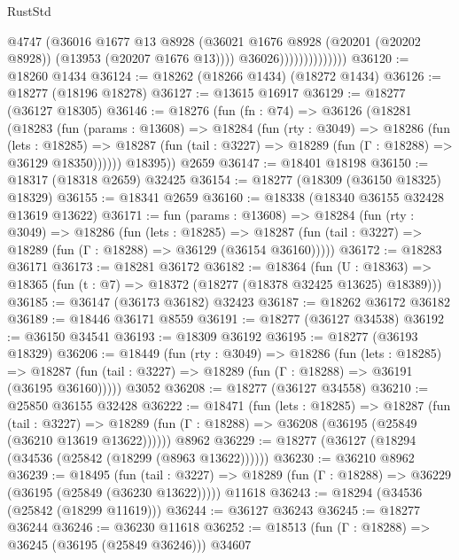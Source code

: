 \begin{lexlean}{RustStd}
\begin{coremodule}
                                @4747
                                (@36016
                                  @1677
                                  @13
                                  @8928
                                  (@36021
                                    @1676
                                    @8928
                                    (@20201 (@20202 @8928))
                                    (@13953 (@20207 @1676 @13))))
                                @36026))))))))))))))
@36120 := @18260 @1434
@36124 := @18262 (@18266 @1434) (@18272 @1434)
@36126 := @18277 (@18196 @18278)
@36127 := @13615 @16917
@36129 := @18277 (@36127 @18305)
@36146 := @18276
    (fun (fn : @74) =>
    @36126
      (@18281
        (@18283
          (fun (params : @13608) =>
          @18284
            (fun (rty : @3049) =>
            @18286
              (fun (lets : @18285) =>
              @18287 (fun (tail : @3227) => @18289 (fun (Γ : @18288) => @36129 @18350))))))
        @18395))
    @2659
@36147 := @18401 @18198
@36150 := @18317 (@18318 @2659) @32425
@36154 := @18277 (@18309 (@36150 @18325) @18329)
@36155 := @18341 @2659
@36160 := @18338 (@18340 @36155 @32428 @13619 @13622)
@36171 := fun (params : @13608) =>
  @18284
    (fun (rty : @3049) =>
    @18286
      (fun (lets : @18285) =>
      @18287 (fun (tail : @3227) => @18289 (fun (Γ : @18288) => @36129 (@36154 @36160)))))
@36172 := @18283 @36171
@36173 := @18281 @36172
@36182 := @18364
    (fun (U : @18363) => @18365 (fun (t : @7) => @18372 (@18277 (@18378 @32425 @13625) @18389)))
@36185 := @36147 (@36173 @36182) @32423
@36187 := @18262 @36172 @36182
@36189 := @18446 @36171 @8559
@36191 := @18277 (@36127 @34538)
@36192 := @36150 @34541
@36193 := @18309 @36192
@36195 := @18277 (@36193 @18329)
@36206 := @18449
    (fun (rty : @3049) =>
    @18286
      (fun (lets : @18285) =>
      @18287 (fun (tail : @3227) => @18289 (fun (Γ : @18288) => @36191 (@36195 @36160)))))
    @3052
@36208 := @18277 (@36127 @34558)
@36210 := @25850 @36155 @32428
@36222 := @18471
    (fun (lets : @18285) =>
    @18287
      (fun (tail : @3227) =>
      @18289 (fun (Γ : @18288) => @36208 (@36195 (@25849 (@36210 @13619 @13622))))))
    @8962
@36229 := @18277 (@36127 (@18294 (@34536 (@25842 (@18299 (@8963 @13622))))))
@36230 := @36210 @8962
@36239 := @18495
    (fun (tail : @3227) => @18289 (fun (Γ : @18288) => @36229 (@36195 (@25849 (@36230 @13622)))))
    @11618
@36243 := @18294 (@34536 (@25842 (@18299 @11619)))
@36244 := @36127 @36243
@36245 := @18277 @36244
@36246 := @36230 @11618
@36252 := @18513 (fun (Γ : @18288) => @36245 (@36195 (@25849 @36246))) @34607

\end{coremodule}
\end{lexlean}
